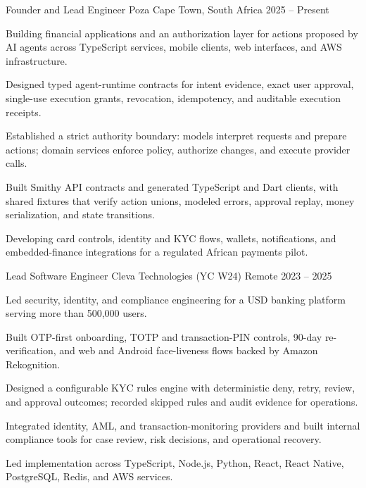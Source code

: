 
\begin{cventries}

\cventry
  {Founder and Lead Engineer}
  {Poza}
  {Cape Town, South Africa}
  {2025 -- Present}
  {
    \begin{cvitems}
      \item {Building financial applications and an authorization layer for actions proposed by AI agents across TypeScript services, mobile clients, web interfaces, and AWS infrastructure.}
      \item {Designed typed agent-runtime contracts for intent evidence, exact user approval, single-use execution grants, revocation, idempotency, and auditable execution receipts.}
      \item {Established a strict authority boundary: models interpret requests and prepare actions; domain services enforce policy, authorize changes, and execute provider calls.}
      \item {Built Smithy API contracts and generated TypeScript and Dart clients, with shared fixtures that verify action unions, modeled errors, approval replay, money serialization, and state transitions.}
      \item {Developing card controls, identity and KYC flows, wallets, notifications, and embedded-finance integrations for a regulated African payments pilot.}
    \end{cvitems}
  }

\cventry
  {Lead Software Engineer}
  {Cleva Technologies (YC W24)}
  {Remote}
  {2023 -- 2025}
  {
    \begin{cvitems}
      \item {Led security, identity, and compliance engineering for a USD banking platform serving more than 500,000 users.}
      \item {Built OTP-first onboarding, TOTP and transaction-PIN controls, 90-day re-verification, and web and Android face-liveness flows backed by Amazon Rekognition.}
      \item {Designed a configurable KYC rules engine with deterministic deny, retry, review, and approval outcomes; recorded skipped rules and audit evidence for operations.}
      \item {Integrated identity, AML, and transaction-monitoring providers and built internal compliance tools for case review, risk decisions, and operational recovery.}
      \item {Led implementation across TypeScript, Node.js, Python, React, React Native, PostgreSQL, Redis, and AWS services.}
    \end{cvitems}
  }


\end{cventries}

